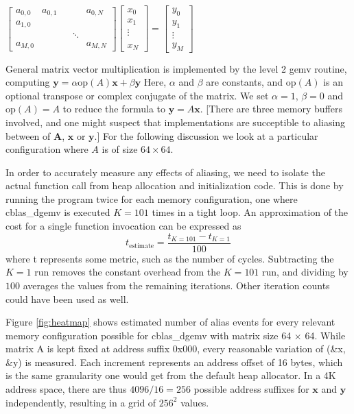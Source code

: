\documentclass[a4paper,10pt,twocolumn,twoside]{article}
\begin{document}
{$
\left[\begin{array}{ccccc}
a_{0,0} & a_{0,1} &  &  & a_{0,N}\\
a_{1,0}\\
 &  &  & \ddots\\
a_{M,0} &  &  &  & a_{M,N}
\end{array}\right]\left[\begin{array}{c}
x_{0}\\
x_{1}\\
\vdots\\
\\
x_{N}
\end{array}\right]=\left[\begin{array}{c}
y_{0}\\
y_{1}\\
\vdots\\
y_{M}
\end{array}\right]
$

General matrix vector multiplication is implemented by the level 2 gemv routine, computing $\boldsymbol{y} = \alpha\text{op}\left(A\right)\boldsymbol{x} + \beta\boldsymbol{y}$
Here, $\alpha$ and $\beta$ are constants, and $\text{op}\left(A\right)$ is an optional transpose or complex conjugate of the matrix. 
We set $\alpha = 1$, $\beta = 0$ and $\text{op} \left(A\right) = A$ to reduce the formula to $\boldsymbol{y}=A\boldsymbol{x}$.
[There are three memory buffers involved, and one might suspect that implementations are succeptible to aliasing between of $\boldsymbol{A}$, $\boldsymbol{x}$ or $\boldsymbol{y}$.]
For the following discussion we look at a particular configuration where $A$ is of size $64\times64$.

In order to accurately measure any effects of aliasing, we need to isolate the actual function call from heap allocation and initialization code.
This is done by running the program twice for each memory configuration, one where cblas\_dgemv is executed $K = 101$ times in a tight loop.
An approximation of the cost for a single function invocation can be expressed as 
$$
t_{\text{estimate}}=\frac{t_{K=101}-t_{K=1}}{100}
$$
where t represents some metric, such as the number of cycles.
Subtracting the $K = 1$ run removes the constant overhead from the $K = 101$ run, and dividing by $100$ averages the values from the remaining iterations.
Other iteration counts could have been used as well.

Figure \ref{fig:heatmap} shows estimated number of alias events for every relevant memory configuration possible for cblas\_dgemv with matrix size 64 $\times$ 64. 
While matrix A is kept fixed at address suffix 0x000, every reasonable variation of (\&x, \&y) is measured.
Each increment represents an address offset of 16 bytes, which is the same granularity one would get from the default heap allocator.
In a 4K address space, there are thus $4096/16 = 256$ possible address suffixes for $\boldsymbol{x}$ and $\boldsymbol{y}$ independently, resulting in a grid of $256^2$ values.

}
\end{document}
